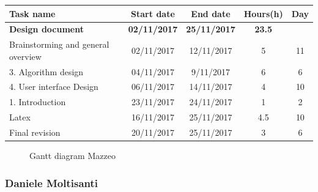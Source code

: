 \begin{table}[h!]
	\begin{tabular}{lcccc}
		\toprule
		\textbf{Task name} & \textbf{Start date} & \textbf{End date} & \textbf{Hours(h)} & \textbf{Day} \\
		\midrule
		\textbf{Design document} & \textbf{02/11/2017} & \textbf{25/11/2017} & \textbf{23.5} &  \\
		Brainstorming and general overview & 02/11/2017 & 12/11/2017 & 5 & 11 \\
		3. Algorithm design & 04/11/2017 & 9/11/2017 & 6 & 6 \\
		4. User interface Design & 06/11/2017 & 14/11/2017 & 4 & 10 \\
		1. Introduction & 23/11/2017 & 24/11/2017 & 1 & 2 \\
		Latex & 16/11/2017 & 25/11/2017 & 4.5 & 10 \\
		\bottomrule
		Final revision & 20/11/2017 & 25/11/2017 & 3 & 6 \\
	\end{tabular}
\end{table}

\begin{figure}[!h]
	\centering
	\caption{Gantt diagram Mazzeo}
\end{figure}
\clearpage

\subsubsection{Daniele Moltisanti}


